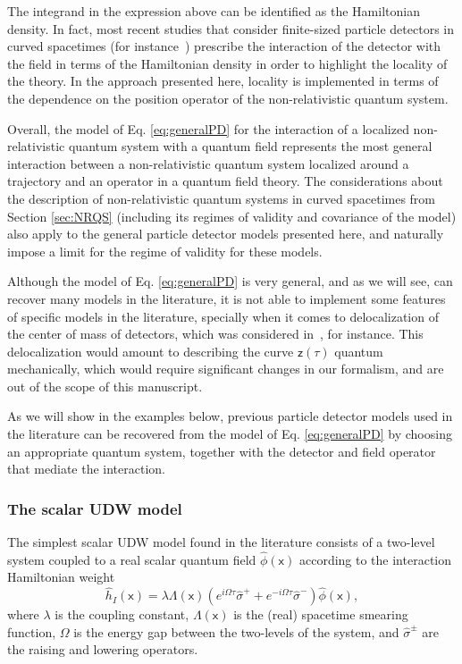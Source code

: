 \documentclass[prd,twocolumn,superscriptaddress,floatfix,amsmath,amssymb,amsfonts,longbibliography,nofootinbib]{revtex4-1}
\newcommand{\mf}{\mathsf}%
\begin{document}
The integrand in the expression above can be identified as the Hamiltonian density. In fact, most recent studies that consider finite-sized particle detectors in curved spacetimes (for instance~\cite{us,us2,PipoFTL,antiparticles,mine,ericksonBH,carol,geometry,ahmed,ericksonKen}) prescribe the interaction of the detector with the field in terms of the Hamiltonian density in order to highlight the locality of the theory. In the approach presented here, locality is implemented in terms of the dependence on the position operator of the non-relativistic quantum system.

Overall, the model of Eq. \eqref{eq:generalPD} for the interaction of a localized non-relativistic quantum system with a quantum field represents the most general interaction between a non-relativistic quantum system localized around a trajectory and an operator in a quantum field theory. The considerations about the description of non-relativistic quantum systems in curved spacetimes from Section \ref{sec:NRQS} (including its regimes of validity and covariance of the model) also apply to the general particle detector models presented here, and naturally impose a limit for the regime of validity for these models. 

Although the model of Eq. \eqref{eq:generalPD} is very general, and as we will see, can recover many models in the literature, it is not able to implement some features of specific models in the literature, specially when it comes to delocalization of the center of mass of detectors, which was considered in~\cite{achimDelocalized,achimDelocalizedHarvesting}, for instance. This delocalization would amount to describing the curve $\mf z(\tau)$ quantum mechanically, which would require significant changes in our formalism, and are out of the scope of this manuscript. 


As we will show in the examples below, previous particle detector models used in the literature can be recovered from the model of Eq. \eqref{eq:generalPD} by choosing an appropriate quantum system, together with the detector and field operator that mediate the interaction. 


\subsubsection{The scalar UDW model} 

The simplest scalar UDW model found in the literature consists of a two-level system coupled to a real scalar quantum field $\hat{\phi}(\mf x)$ according to the interaction Hamiltonian weight~\cite{us,us2,PipoFTL,BrunoDan,antiparticles}
\begin{equation}\label{eq:UDW}
    \hat{h}_I(\mf x) = \lambda \Lambda(\mf x) (e^{i \Omega \tau}\hat{\sigma}^++e^{-i \Omega \tau}\hat{\sigma}^-)\hat{\phi}(\mf x),
\end{equation}
where $\lambda$ is the coupling constant, $\Lambda(\mf x)$ is the (real) spacetime smearing function, $\Omega$ is the energy gap between the two-levels of the system, and $\hat{\sigma}^\pm$ are the raising and lowering operators.
\end{document}
